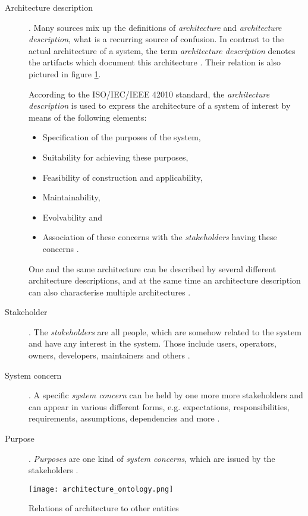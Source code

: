 \begin{description}
\item [Architecture description].
	Many sources mix up the definitions of \emph{architecture} and \emph{architecture description}, what is a recurring source of confusion. In contrast to the actual architecture of a system, the term \emph{architecture description} denotes the artifacts which document this architecture \cite{ISO_42010}. Their relation is also pictured in figure \ref{fig:architecture_ontology}.

	According to the ISO/IEC/IEEE 42010 standard, the \emph{architecture description} is used to express the architecture of a system of interest by means of the following elements:
	\begin{itemize}
	\item Specification of the purposes of the system,
	\item Suitability for achieving these purposes,
	\item Feasibility of construction and applicability,
	\item Maintainability,
	\item Evolvability and
	\item Association of these concerns with the \emph{stakeholders} having these concerns \cite{ISO_42010}.
	\end{itemize}
	One and the same architecture can be described by several different architecture descriptions, and at the same time an architecture description can also characterise multiple architectures \cite{ISO_42010}.

\item [Stakeholder].
	The \emph{stakeholders} are all people, which are somehow related to the system and have any interest in the system. Those include users, operators, owners, developers, maintainers and others \cite{ISO_42010}.

\item [System concern].
	A specific \emph{system concern} can be held by one more more stakeholders and can appear in various different forms, e.g. expectations, responsibilities, requirements, assumptions, dependencies and more \cite{ISO_42010}. 

\item [Purpose].
	\emph{Purposes} are one kind of \emph{system concerns}, which are issued by the stakeholders \cite{ISO_42010}.
\end{description}

\begin{figure}[!htbp]
\centering
\texttt{[image: architecture\_ontology.png]}
\caption{Relations of architecture to other entities \cite{ISO_42010}}
\label{fig:architecture_ontology}
\end{figure}










